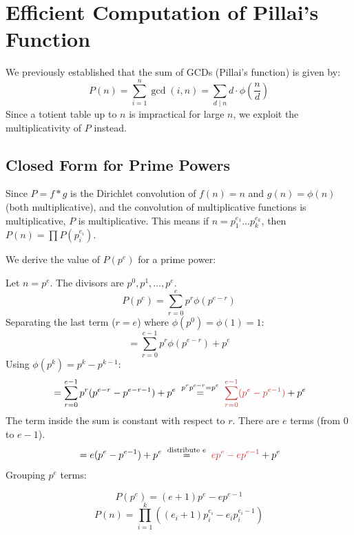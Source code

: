 \documentclass[11pt]{article}
\begin{document}
\pagebreak
\section{Efficient Computation of Pillai's Function}
\label{sec:pillai_optimization}

We previously established that the sum of GCDs (Pillai's function) is given by:
\[ P(n) = \sum_{i=1}^n \gcd(i, n) = \sum_{d \mid n} d \cdot \phi\left(\frac{n}{d}\right) \]
Since a totient table up to $n$ is impractical for large $n$, we exploit the multiplicativity of $P$ instead.

\subsection{Closed Form for Prime Powers}

Since $P = f * g$ is the Dirichlet convolution of $f(n) = n$ and $g(n) = \phi(n)$ (both multiplicative), and the convolution of multiplicative functions is multiplicative, $P$ is multiplicative. This means if $n = p_1^{e_1} \dots p_k^{e_k}$, then $P(n) = \prod P(p_i^{e_i})$.

We derive the value of $P(p^e)$ for a prime power:

\begin{derivation}
    Let $n = p^e$. The divisors are $p^0, p^1, \dots, p^e$.
    \[ P(p^e) = \sum_{r=0}^e p^r \phi(p^{e-r}) \]
    Separating the last term ($r=e$) where $\phi(p^0) = \phi(1) = 1$:
    \[ = \sum_{r=0}^{e-1} p^r \phi(p^{e-r}) + p^e \]
    Using $\phi(p^k) = p^k - p^{k-1}$:
    \[ {}= \sum_{r=0}^{e-1} p^r (p^{e-r} - p^{e-r-1}) + p^e
        \;\overset{\scriptstyle p^r p^{e-r} = p^e}{=}\;
        \textcolor{secondary}{\sum_{r=0}^{e-1} (p^e - p^{e-1})} + p^e \]
    The term inside the sum is constant with respect to $r$. There are $e$ terms (from $0$ to $e-1$).
    \[ {}= e(p^e - p^{e-1}) + p^e
        \;\overset{\scriptstyle \text{distribute } e}{=}\;
        \textcolor{secondary}{e p^e - e p^{e-1}} + p^e \]
    Grouping $p^e$ terms:
\end{derivation}

\begin{resultbox}
    \begin{equation}
        P(p^e) = (e+1)p^e - e p^{e-1}
        \label{eq:pillai_prime_power}
    \end{equation}
    \begin{equation}
        P(n) = \prod_{i=1}^k \left( (e_i+1)p_i^{e_i} - e_i p_i^{e_i-1} \right)
        \label{eq:pillai_prime_power_for_n}
    \end{equation}
\end{resultbox}
\end{document}

